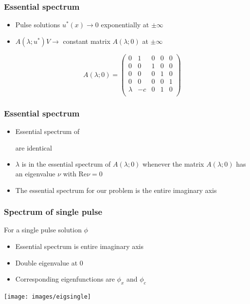 \documentclass[16pt]{beamer}
\begin{document}
\begin{frame}
	\frametitle{Essential spectrum}
	\fontsize{16}{7.2}\selectfont
	\begin{itemize}
		\item Pulse solutions $u^*(x) \rightarrow 0$ exponentially at $\pm \infty$
		\item $A(\lambda; u^*)V \rightarrow$ constant matrix $A(\lambda; 0)$ at $\pm \infty$
		\begin{center}
		\[
			A(\lambda;0) = 
			\begin{pmatrix}
			0 & 1 & 0 & 0 & 0\\
			0 & 0 & 1 & 0 & 0\\
			0 & 0 & 0 & 1 & 0\\
			0 & 0 & 0 & 0 & 1\\
			\lambda & -c & 0 & 1 & 0 \\ 
			\end{pmatrix}
		\]
		\end{center}
	\end{itemize}
\end{frame}

\begin{frame}
	\frametitle{Essential spectrum}
	\fontsize{16}{7.2}\selectfont
	\begin{itemize}
		\item<1-> Essential spectrum of 
		are identical
	\vspace{0.5cm}
		\item<2-> $\lambda$ is in the essential spectrum of $A(\lambda; 0)$ whenever the matrix $A(\lambda; 0)$ has an eigenvalue $\nu$ with $\text{Re} \nu = 0$

	\vspace{0.5cm}
		\item<3->The essential spectrum for our problem is the entire imaginary axis

	\end{itemize}
\end{frame}


\begin{frame}
	\frametitle{Spectrum of single pulse}
	\fontsize{16}{7.2}\selectfont
	For a single pulse solution $\phi$
	\begin{itemize}
		\item Essential spectrum is entire imaginary axis
		\vspace{0.5cm}
		\item Double eigenvalue at 0
		\vspace{0.5cm}
		\item Corresponding eigenfunctions are $\phi_x$ and $\phi_c$
	\end{itemize}
	\begin{center}
		\texttt{[image: images/eigsingle]}
	\end{center}
\end{frame}
\end{document}
